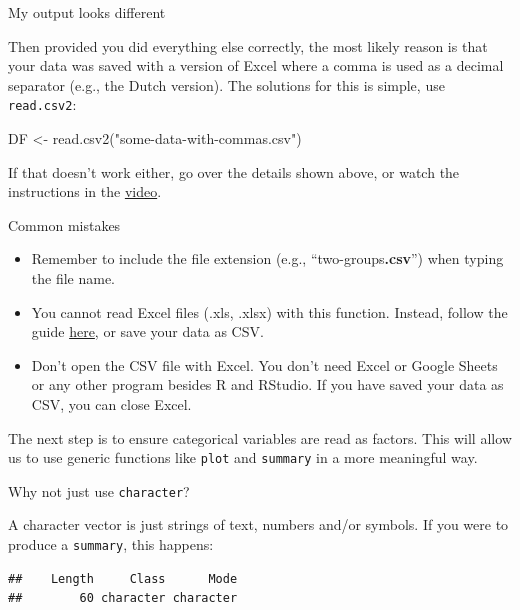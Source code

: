 \documentclass[
]{book}
\newenvironment{Shaded}{\begin{snugshade}}{\end{snugshade}}
\newcommand{\FunctionTok}[1]{\textcolor[rgb]{0.00,0.00,0.00}{#1}}
\newcommand{\NormalTok}[1]{#1}
\newcommand{\OtherTok}[1]{\textcolor[rgb]{0.56,0.35,0.01}{#1}}
\newcommand{\SpecialCharTok}[1]{\textcolor[rgb]{0.00,0.00,0.00}{#1}}
\newcommand{\StringTok}[1]{\textcolor[rgb]{0.31,0.60,0.02}{#1}}
\providecommand{\tightlist}{%
  \setlength{\itemsep}{0pt}\setlength{\parskip}{0pt}}
\begin{document}
My output looks different

Then provided you did everything else correctly, the most likely reason is that your data was saved with a version of Excel where a comma is used as a decimal separator (e.g., the Dutch version). The solutions for this is simple, use \texttt{read.csv2}:

\begin{Shaded}
\begin{Highlighting}[]
\NormalTok{DF }\OtherTok{\textless{}{-}} \FunctionTok{read.csv2}\NormalTok{(}\StringTok{"some{-}data{-}with{-}commas.csv"}\NormalTok{)}
\end{Highlighting}
\end{Shaded}

If that doesn't work either, go over the details shown above, or watch the instructions in the \href{https://youtu.be/BGUqZc-Pb8w}{video}.

Common mistakes

\begin{itemize}
\tightlist
\item
  Remember to include the file extension (e.g., ``two-groups\textbf{.csv}'') when typing the file name.
\item
  You cannot read Excel files (.xls, .xlsx) with this function. Instead, follow the guide \protect\hyperlink{read}{here}, or save your data as CSV.
\item
  Don't open the CSV file with Excel. You don't need Excel or Google Sheets or any other program besides R and RStudio. If you have saved your data as CSV, you can close Excel.
\end{itemize}

The next step is to ensure categorical variables are read as factors. This will allow us to use generic functions like \texttt{plot} and \texttt{summary} in a more meaningful way.

Why not just use \texttt{character}?

A character vector is just strings of text, numbers and/or symbols. If you were to produce a \texttt{summary}, this happens:

\begin{Shaded}
\end{Shaded}

\begin{verbatim}
##    Length     Class      Mode 
##        60 character character
\end{verbatim}
\end{document}
